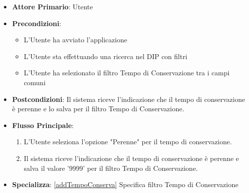 \label{compilaValoreFiltroTempoDiConservazionePerenne}
\begin{itemize}
      \item \textbf{Attore Primario}: Utente
      \item \textbf{Precondizioni}: 
      \begin{itemize}
            \item L'Utente ha avviato l'applicazione
            \item L'Utente sta effettuando una ricerca nel DIP con filtri
            \item L'Utente ha selezionato il filtro Tempo di Conservazione tra i campi comuni
      \end{itemize}
      \item \textbf{Postcondizioni}: Il sistema riceve l'indicazione che il tempo di conservazione è perenne e lo salva per il filtro Tempo di Conservazione.
      \item \textbf{Flusso Principale}:
      \begin{enumerate}
            \item L'Utente seleziona l'opzione "Perenne" per il tempo di conservazione.
            \item Il sistema riceve l'indicazione che il tempo di conservazione è perenne e salva il valore '9999' per il filtro Tempo di Conservazione.
      \end{enumerate}
      \item \textbf{Specializza}: \ref{addTempoConserva} Specifica filtro Tempo di Conservazione
\end{itemize}


